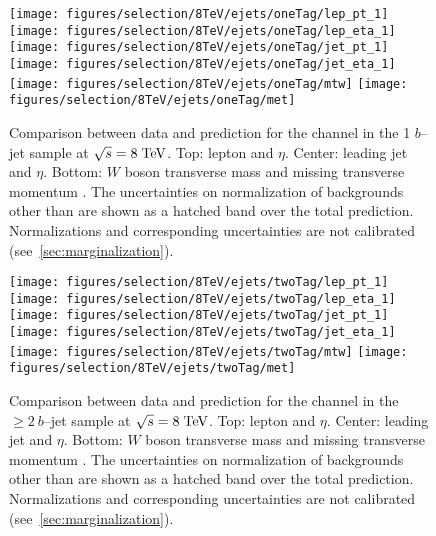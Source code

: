 \begin{figure}
  \centering
  \texttt{[image: figures/selection/8TeV/ejets/oneTag/lep\_pt\_1]}
  \texttt{[image: figures/selection/8TeV/ejets/oneTag/lep\_eta\_1]}
  \texttt{[image: figures/selection/8TeV/ejets/oneTag/jet\_pt\_1]}
  \texttt{[image: figures/selection/8TeV/ejets/oneTag/jet\_eta\_1]}
  \texttt{[image: figures/selection/8TeV/ejets/oneTag/mtw]}
  \texttt{[image: figures/selection/8TeV/ejets/oneTag/met]}
  \caption{
    Comparison between data and prediction for the \ejets{}
    channel in the 1 $b$--jet sample at $\sqrt{s} = 8 \; \mathrm{TeV}{}$. Top: lepton \pt{} and
    $\eta$. Center: leading jet \pt{} and $\eta$. Bottom: $W$ boson
    transverse mass \mtw{} and missing transverse momentum \met{}.
    The uncertainties on normalization of backgrounds other than
    \wjets{} are shown as a hatched band over the total prediction.
    Normalizations and corresponding uncertainties are not calibrated
    (see~\ref{sec:marginalization}).
  }
  \label{fig:2012ele_1tag}
\end{figure}
%
\begin{figure}
  \centering
  \texttt{[image: figures/selection/8TeV/ejets/twoTag/lep\_pt\_1]}
  \texttt{[image: figures/selection/8TeV/ejets/twoTag/lep\_eta\_1]}
  \texttt{[image: figures/selection/8TeV/ejets/twoTag/jet\_pt\_1]}
  \texttt{[image: figures/selection/8TeV/ejets/twoTag/jet\_eta\_1]}
  \texttt{[image: figures/selection/8TeV/ejets/twoTag/mtw]}
  \texttt{[image: figures/selection/8TeV/ejets/twoTag/met]}
  \caption{
   Comparison between data and prediction for the \ejets{}
    channel in the $\geq2~b$--jet sample at $\sqrt{s} = 8 \; \mathrm{TeV}{}$. Top: lepton \pt{} and
    $\eta$. Center: leading jet \pt{} and $\eta$. Bottom: $W$ boson
    transverse mass \mtw{} and missing transverse momentum \met{}.
    The uncertainties on normalization of backgrounds other than
    \wjets{} are shown as a hatched band over the total prediction.
    Normalizations and corresponding uncertainties are not calibrated
    (see~\ref{sec:marginalization}).
  }
  \label{fig:2012ele_2tag}
\end{figure}



